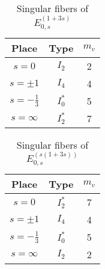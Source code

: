 \documentclass[main]{subfiles}
\begin{document}
\begin{table}[h]
    \centering
    \caption{Singular fibers of $E_{0,s}^{(1 + 3s)}$}
    \begin{tabular}{|c|c|c|}
        \hline
        Place            & Type    & $m_v$ \\
        \hline
        $s=0$            & $I_2$   & 2     \\
        $s=\pm 1$        & $I_4$   & 4     \\
        $s=-\frac{1}{3}$ & $I_0^*$ & 5     \\
        $s=\infty$       & $I_2^*$ & 7     \\
        \hline
    \end{tabular}
\end{table}

\begin{table}[h]
    \centering
    \caption{Singular fibers of $E_{0,s}^{(s(1 + 3s))}$}
    \begin{tabular}{|c|c|c|}
        \hline
        Place            & Type    & $m_v$ \\
        \hline
        $s=0$            & $I_2^*$ & 7     \\
        $s=\pm 1$        & $I_4$   & 4     \\
        $s=-\frac{1}{3}$ & $I_0^*$ & 5     \\
        $s=\infty$       & $I_2$   & 2     \\
        \hline
    \end{tabular}
\end{table}
\end{document}
